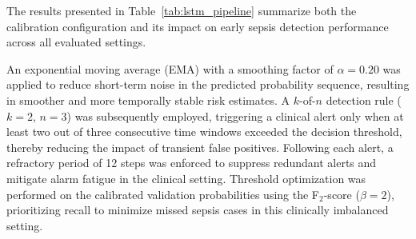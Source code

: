 \documentclass[conference]{IEEEtran}
\begin{document}
\begin{table}[H]
\centering
\caption{Calibration and threshold optimization parameters 
for the LSTM model.}
\label{tab:lstm_pipeline}
\renewcommand{\arraystretch}{1.3}
\end{table}

The results presented in Table~\ref{tab:lstm_pipeline} summarize 
both the calibration configuration and its impact on early sepsis 
detection performance across all evaluated settings.

An exponential moving average (EMA) with a smoothing factor of 
$\alpha = 0.20$ was applied to reduce short-term noise in the 
predicted probability sequence, resulting in smoother and more 
temporally stable risk estimates. A $k$-of-$n$ detection rule 
($k = 2$, $n = 3$) was subsequently employed, triggering a 
clinical alert only when at least two out of three consecutive 
time windows exceeded the decision threshold, thereby reducing 
the impact of transient false positives. Following each alert, 
a refractory period of 12 steps was enforced to suppress 
redundant alerts and mitigate alarm fatigue in the clinical 
setting. Threshold optimization was performed on the 
calibrated validation probabilities using the F$_2$-score 
($\beta = 2$), prioritizing recall to minimize missed sepsis 
cases in this clinically imbalanced setting.
\end{document}
